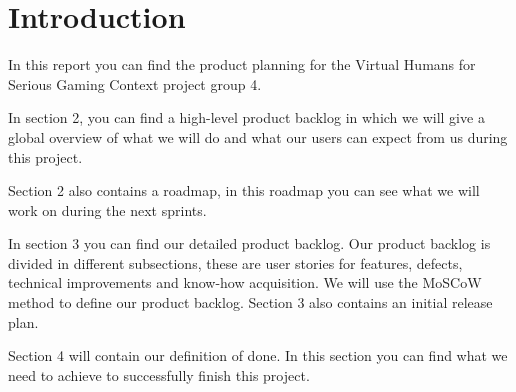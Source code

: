 \section{Introduction}
In this report you can find the product planning for the Virtual Humans for Serious Gaming Context project group 4. \\ \par 
In section 2, you can find a high-level product backlog in which we will give a global overview of what we will do and what our users can expect from us during this project. \par
Section 2 also contains a roadmap, in this roadmap you can see what we will work on during the next sprints. \\ \par
In section 3 you can find our detailed product backlog. Our product backlog is divided in different subsections, these are user stories for features, defects, technical improvements and know-how acquisition. We will use the MoSCoW method to define our product backlog. Section 3 also contains an initial release plan. \\ \par
Section 4 will contain our definition of done. In this section you can find what we need to achieve to successfully finish this project. \\ \par
